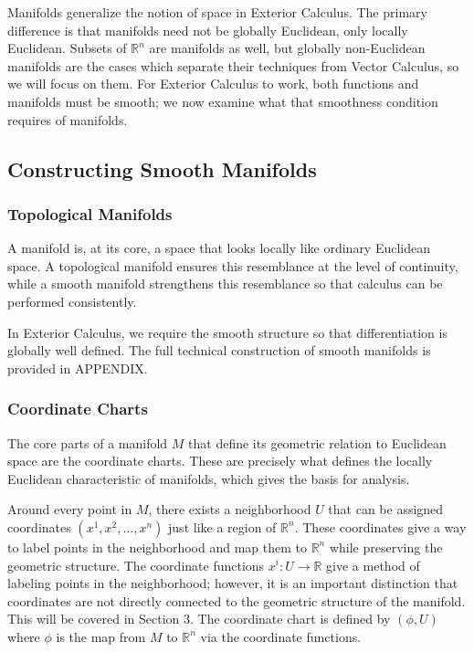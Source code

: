 \documentclass[12pt]{article}
\newcommand{\R}{\mathbb{R}}
\begin{document}
Manifolds generalize the notion of space in Exterior Calculus. The primary difference is that manifolds need not be globally Euclidean, only locally Euclidean. Subsets of $\R^n$ are manifolds as well, but globally non-Euclidean manifolds are the cases which separate their techniques from Vector Calculus, so we will focus on them. For Exterior Calculus to work, both functions and manifolds must be smooth; we now examine what that smoothness condition requires of manifolds.

\subsection{Constructing Smooth Manifolds}

\subsubsection{Topological Manifolds}
A manifold is, at its core, a space that looks locally like ordinary Euclidean space. A topological manifold ensures this resemblance at the level of continuity, while a smooth manifold strengthens this resemblance so that calculus can be performed consistently.

In Exterior Calculus, we require the smooth structure so that differentiation is globally well defined. The full technical construction of smooth manifolds is provided in APPENDIX.

\subsubsection{Coordinate Charts}
The core parts of a manifold $M$ that define its geometric relation to Euclidean space are the coordinate charts. These are precisely what defines the locally Euclidean characteristic of manifolds, which gives the basis for analysis. 

Around every point in $M$, there exists a neighborhood $U$ that can be assigned coordinates $(x^1,x^2, \dots, x^n)$ just like a region of $\R^n$. These coordinates give a way to label points in the neighborhood and map them to $\R^n$ while preserving the geometric structure. The coordinate functions $x^i:U\to \R$ give a method of labeling points in the neighborhood; however, it is an important distinction that coordinates are not directly connected to the geometric structure of the manifold. This will be covered in Section 3. The coordinate chart is defined by $(\phi, U)$ where $\phi$ is the map from $M$ to $\R^n$ via the coordinate functions.
\end{document}
